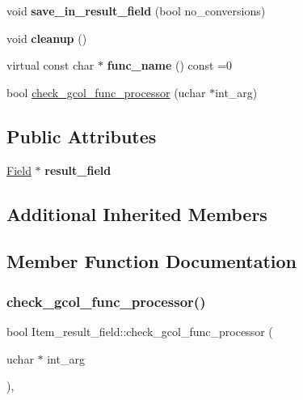 \begin{DoxyCompactItemize}
void {\bfseries save\+\_\+in\+\_\+result\+\_\+field} (bool no\+\_\+conversions)
\item 
\mbox{\label{classItem__result__field_ac2067f4e5f1ee690c5cb741653c817c2}} 
void {\bfseries cleanup} ()
\item 
\mbox{\label{classItem__result__field_a28240362dbad5785cfcfed0f0fef2f57}} 
virtual const char $\ast$ {\bfseries func\+\_\+name} () const =0
\item 
bool \mbox{\hyperlink{classItem__result__field_a12324702e7f419b47de45e3505730441}{check\+\_\+gcol\+\_\+func\+\_\+processor}} (uchar $\ast$int\+\_\+arg)
\end{DoxyCompactItemize}
\subsection*{Public Attributes}
\begin{DoxyCompactItemize}
\item 
\mbox{\label{classItem__result__field_a4e24816a49ad9ad54bca413d1a39f6d2}} 
\mbox{\hyperlink{classField}{Field}} $\ast$ {\bfseries result\+\_\+field}
\end{DoxyCompactItemize}
\subsection*{Additional Inherited Members}


\subsection{Member Function Documentation}
\mbox{\label{classItem__result__field_a12324702e7f419b47de45e3505730441}} 
\subsubsection{\texorpdfstring{check\+\_\+gcol\+\_\+func\+\_\+processor()}{check\_gcol\_func\_processor()}}
{\footnotesize\ttfamily bool Item\+\_\+result\+\_\+field\+::check\+\_\+gcol\+\_\+func\+\_\+processor (\begin{DoxyParamCaption}\item[{uchar $\ast$}]{int\+\_\+arg }\end{DoxyParamCaption})\hspace{0.3cm}{\ttfamily [inline]}, {\ttfamily [virtual]}}

